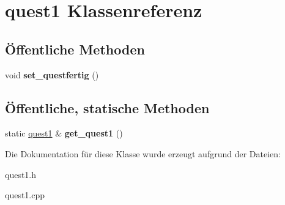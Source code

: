 \hypertarget{classquest1}{\section{quest1 Klassenreferenz}
\label{classquest1}
}
\subsection*{Öffentliche Methoden}
\begin{DoxyCompactItemize}
\item 
\hypertarget{classquest1_a0d15ef2a709da84e40eeebfe9d013ca2}{void {\bfseries set\-\_\-questfertig} ()}\label{classquest1_a0d15ef2a709da84e40eeebfe9d013ca2}

\end{DoxyCompactItemize}
\subsection*{Öffentliche, statische Methoden}
\begin{DoxyCompactItemize}
\item 
\hypertarget{classquest1_a042d65f81c5ab7a6766dacd68f268613}{static \hyperlink{classquest1}{quest1} \& {\bfseries get\-\_\-quest1} ()}\label{classquest1_a042d65f81c5ab7a6766dacd68f268613}

\end{DoxyCompactItemize}


Die Dokumentation für diese Klasse wurde erzeugt aufgrund der Dateien\-:\begin{DoxyCompactItemize}
\item 
quest1.\-h\item 
quest1.\-cpp\end{DoxyCompactItemize}
